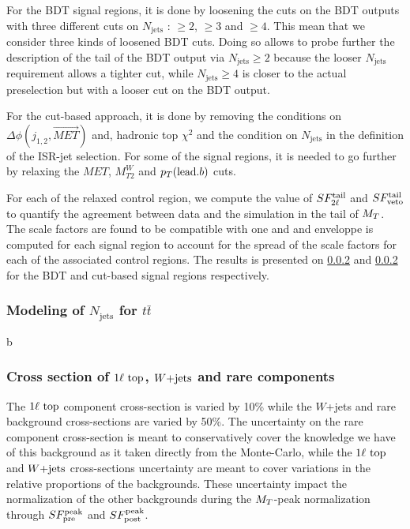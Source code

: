             For the BDT signal regions, it is done by loosening the cuts on the BDT outputs with
            three different cuts on $N_\text{jets}$ : $\geq 2$, $\geq 3$ and $\geq 4$. This mean
            that we consider three kinds of loosened BDT cuts. Doing so allows to probe further the
            description of the tail of the BDT output via $N_\text{jets} \geq 2$ because the looser
            $N_\text{jets}$ requirement allows a tighter cut, while $N_\text{jets} \geq 4$ is closer
            to the actual preselection but with a looser cut on the BDT output. 

            For the cut-based approach, it is done by removing the conditions on $\Delta \phi( j_{1,2},
            \vec{MET} )$ and, hadronic top $\chi^2$ and the condition on $N_\text{jets}$ in the definition
            of the ISR-jet selection. For some of the signal regions, it is needed to go further by 
            relaxing the $MET$, $M_{T2}^W$ and $p_T(\text{lead.} b)$ cuts. 

            For each of the relaxed control region, we compute the value of $SF_{2\ell}^{\text{tail}}$ and
            $SF_{\text{veto}}^{\text{tail}}$ to quantify the agreement between data and the simulation in the tail of $M_T$.
            The scale factors are found to be compatible with one and and enveloppe is computed for
            each signal region to account for the spread of the scale factors for each of the
            associated control regions. The results is presented on \ref{} and \ref{} for the BDT and
            cut-based signal regions respectively.

            \subsubsection{Modeling of $N_\text{jets}$ for $t\bar{t}$}

            b

            \subsubsection{Cross section of $1\ell~\text{top}$, $\text{$W$+jets}$ and rare components}
        
            The $1\ell~\text{top}$ component cross-section is varied by 10\% while the $W$+jets 
            and rare background cross-sections are varied by 50\%. The uncertainty on the rare 
            component cross-section is meant to conservatively cover the knowledge we have of 
            this background as it taken directly from the Monte-Carlo, while the $1\ell~\text{top}$ and 
            $\text{$W$+jets}$ cross-sections uncertainty are meant to cover variations in the relative 
            proportions of the backgrounds. These uncertainty impact the normalization of the 
            other backgrounds during the $M_T$-peak normalization through $SF_{\text{pre}}^{\text{peak}}$ and $SF_{\text{post}}^{\text{peak}}$.

